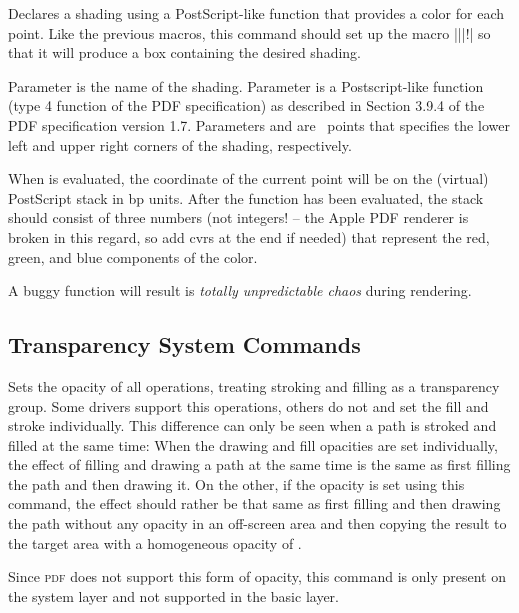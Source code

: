 \begin{command}{\pgfsys@functionalshading{}}
 Declares a shading using a PostScript-like function that provides a
 color for each point. Like the previous macros, this command
 should set up the macro |\@pgfshading||!| so that it will
 produce a box containing the desired shading.

 Parameter  is the name of the shading. Parameter
  is a
 Postscript-like function (type 4 function of the PDF specification)
 as described in Section 3.9.4 of the PDF specification version 1.7.
 Parameters  and  are
 \pgfname\ points that specifies the lower left and upper right
 corners of the shading, respectively.

 When  is evaluated, the coordinate of the current
 point will be on the (virtual) PostScript stack in bp units. After
 the function has been evaluated, the stack should consist of three
 numbers (not integers! -- the Apple PDF renderer is broken in this
 regard, so add cvrs at the end if needed) that represent the red,
 green, and blue components of the color.

 A buggy function will result is \emph{totally unpredictable chaos} during
 rendering.
\end{command}



\subsection{Transparency System Commands}

\begin{command}{\pgfsys@opacity{}}
  Sets the opacity of all operations, treating stroking and filling as
  a transparency group. Some drivers support this operations, others
  do not and set the fill and stroke individually. This difference can
  only be seen when a path is stroked and filled at the same time:
  When the drawing and fill opacities are set individually, the effect
  of filling and drawing a path at the same time is the same as first
  filling the path and then drawing it. On the other, if the opacity
  is set using this command, the effect should rather be that same as
  first filling and then drawing the path without any opacity in an
  off-screen area and then copying the result to the target area with
  a homogeneous opacity of .

  Since \textsc{pdf} does not support this form of opacity, this
  command is only present on the system layer and not supported in the
  basic layer.
\end{command}

